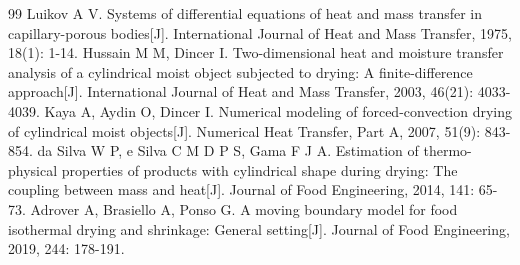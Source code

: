 
\begin{thebibliography}{99}
 Luikov A V. Systems of differential equations of heat and mass transfer in capillary-porous bodies[J]. International Journal of Heat and Mass Transfer, 1975, 18(1): 1-14.
 Hussain M M, Dincer I. Two-dimensional heat and moisture transfer analysis of a cylindrical moist object subjected to drying: A finite-difference approach[J]. International Journal of Heat and Mass Transfer, 2003, 46(21): 4033-4039.
 Kaya A, Aydin O, Dincer I. Numerical modeling of forced-convection drying of cylindrical moist objects[J]. Numerical Heat Transfer, Part A, 2007, 51(9): 843-854.
 da Silva W P, e Silva C M D P S, Gama F J A. Estimation of thermo-physical properties of products with cylindrical shape during drying: The coupling between mass and heat[J]. Journal of Food Engineering, 2014, 141: 65-73.
 Adrover A, Brasiello A, Ponso G. A moving boundary model for food isothermal drying and shrinkage: General setting[J]. Journal of Food Engineering, 2019, 244: 178-191.
\end{thebibliography}
